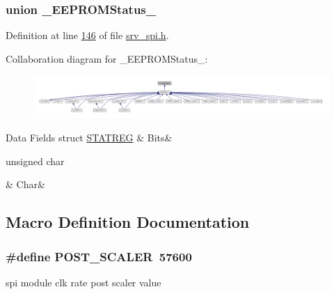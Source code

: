 \subsubsection{union \+\_\+\+E\+E\+P\+R\+O\+M\+Status\+\_\+}


Definition at line \hyperlink{a00011_source_l00146}{146} of file \hyperlink{a00011_source}{srv\+\_\+spi.\+h}.



Collaboration diagram for \+\_\+\+E\+E\+P\+R\+O\+M\+Status\+\_\+\+:\nopagebreak
\begin{figure}[H]
\begin{center}
\leavevmode
\includegraphics[width=350pt]{d9/d49/a01696}
\end{center}
\end{figure}
\begin{DoxyFields}{Data Fields}
\hypertarget{a00011_ab27a4d6dd2be64057b4adc7c0bdc4c07}{struct \hyperlink{a00011_d8/d7f/a00787}{S\+T\+A\+T\+R\+E\+G}}\label{a00011_ab27a4d6dd2be64057b4adc7c0bdc4c07}
&
Bits&
\\
\hline

\hypertarget{a00011_a4362ad9fde44c7f551e727c72cfa111b}{unsigned char}\label{a00011_a4362ad9fde44c7f551e727c72cfa111b}
&
Char&
\\
\hline

\end{DoxyFields}


\subsection{Macro Definition Documentation}
\hypertarget{a00011_a5df9b14c775d6e4eab17c79a729a4dbf}{
\subsubsection[{P\+O\+S\+T\+\_\+\+S\+C\+A\+L\+E\+R}]{\setlength{\rightskip}{0pt plus 5cm}\#define P\+O\+S\+T\+\_\+\+S\+C\+A\+L\+E\+R~57600}}\label{a00011_a5df9b14c775d6e4eab17c79a729a4dbf}


spi module clk rate post scaler value 



